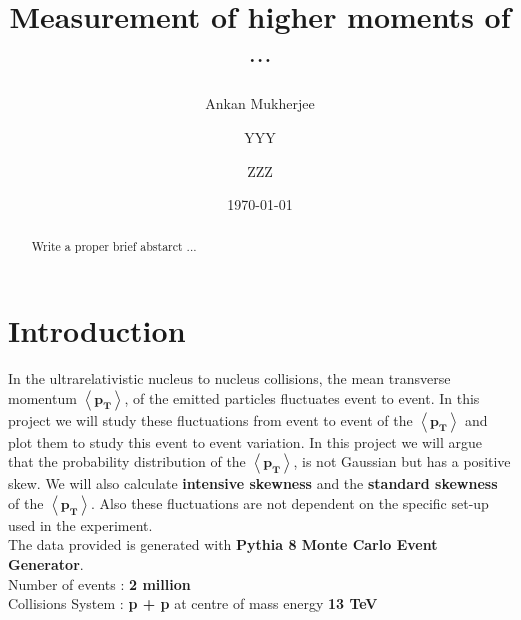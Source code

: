 \documentclass[letterpaper,aps,prc,superscriptaddress,nofootinbib,10pt,showpacs,floatfix]{revtex4-2}%
\begin{document}
\title{ Measurement of higher moments of   $\cdots$}
\author{Ankan Mukherjee} 
\author{YYY}
\author{ZZZ}



\date{\today}  



\begin{abstract}

Write a proper brief abstarct ...
\end{abstract}

\maketitle

\section{Introduction}

In the ultrarelativistic nucleus to nucleus collisions, the mean transverse momentum $\mathbf{\left<p_T\right>}$, of the emitted particles fluctuates event to event.
In this project we will study these fluctuations from event to event of the $\mathbf{\left<p_T\right>}$ and plot them to study this event to event variation. 
In this project we will argue that the probability distribution of the $\mathbf{\left<p_T\right>}$, is not Gaussian but has a positive skew. 
We will also calculate \textbf{intensive skewness} and the \textbf{standard skewness} of the $\mathbf{\left<p_T\right>}$.
Also these fluctuations are not dependent on the specific set-up used in the experiment.\vspace{2mm}\\
The data provided is generated with \textbf{Pythia 8 Monte Carlo Event Generator}.\vspace{2mm}\\
Number of events :  \textbf{2 million} \\
Collisions System :  \textbf{p + p} at centre of mass energy \textbf{13 TeV}\\
\end{document}
